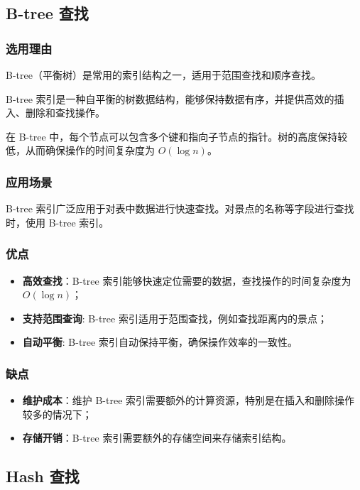 \documentclass{ctexart}
\begin{document}
\subsection{B-tree 查找}

\subsubsection{选用理由}

B-tree（平衡树）是常用的索引结构之一，适用于范围查找和顺序查找。

B-tree 索引是一种自平衡的树数据结构，能够保持数据有序，并提供高效的插入、删除和查找操作。

在 B-tree 中，每个节点可以包含多个键和指向子节点的指针。树的高度保持较低，从而确保操作的时间复杂度为 $O(\log n)$。

\subsubsection{应用场景}

B-tree 索引广泛应用于对表中数据进行快速查找。对景点的名称等字段进行查找时，使用 B-tree 索引。

\subsubsection{优点}

\begin{itemize}
    \item \textbf{高效查找}：B-tree 索引能够快速定位需要的数据，查找操作的时间复杂度为 $O(\log n)$；
    \item \textbf{支持范围查询}: B-tree 索引适用于范围查找，例如查找距离内的景点；
    \item \textbf{自动平衡}: B-tree 索引自动保持平衡，确保操作效率的一致性。
\end{itemize}

\subsubsection{缺点}

\begin{itemize}
    \item \textbf{维护成本}：维护 B-tree 索引需要额外的计算资源，特别是在插入和删除操作较多的情况下；
    \item \textbf{存储开销}：B-tree 索引需要额外的存储空间来存储索引结构。
\end{itemize}

\subsection{Hash 查找}
\end{document}
